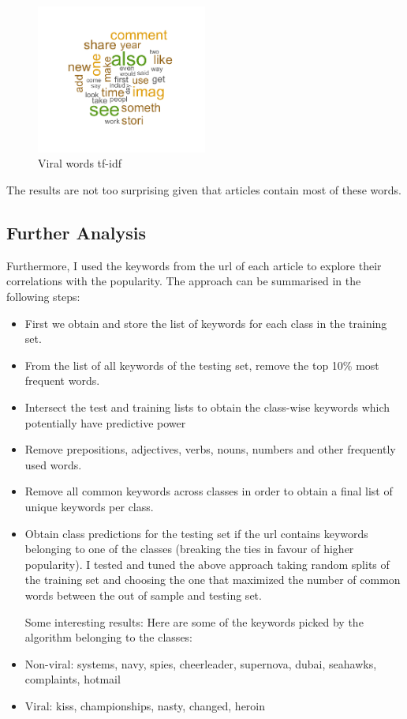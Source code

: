 \documentclass[twoside,twocolumn]{article}
\begin{document}
\begin{figure}[!htb]
  \caption{Viral words tf-idf}
  \centering
    \includegraphics[width=0.5\textwidth]{viral_tfidf.png}
\end{figure}

The results are not too surprising given that articles contain most of these words.
\subsection{Further Analysis}
Furthermore, I used the keywords from the url of each article to explore their correlations with the popularity.
The approach can be summarised in the following steps:

\begin{itemize}

\item First we obtain and store the list of keywords for each class in the training set.
\item From the list of all keywords of the testing set, remove the top 10\% most frequent words.
\item Intersect the test and training lists to obtain the class-wise keywords which potentially have predictive power
\item Remove prepositions, adjectives, verbs, nouns, numbers and other frequently used words.
\item Remove all common keywords across classes in order to obtain a final list of unique keywords per class.
\item Obtain class predictions for the testing set if the url contains keywords belonging to one of the classes
(breaking the ties in favour of higher popularity).
I tested and tuned the above approach taking random splits of the training set and choosing the one that
maximized the number of common words between the out of sample and testing set.

Some interesting results: Here are some of the keywords picked by the algorithm belonging to the classes:
\item Non-viral: systems, navy, spies, cheerleader, supernova, dubai, seahawks, complaints, hotmail
\item Viral: kiss, championships, nasty, changed, heroin
\end{itemize} 
\end{document}
